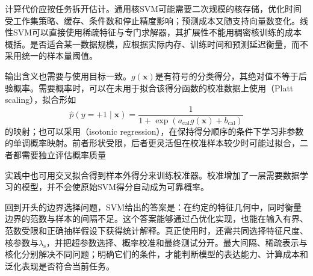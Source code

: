 计算代价应按任务拆开估计。通用核SVM可能需要二次规模的核存储，优化时间受工作集策略、缓存、条件数和停止精度影响；预测成本又随支持向量数变化。线性SVM可以直接使用稀疏特征与专门求解器，其扩展性不能用稠密核训练的成本概括。是否适合某一数据规模，应根据实际内存、训练时间和预测延迟衡量，而不采用统一的样本量阈值。

输出含义也需要与使用目标一致。$g(\bm{x})$是有符号的分类得分，其绝对值不等于后验概率。需要概率时，可以在未用于拟合该得分函数的校准数据上使用（Platt scaling），拟合形如
\[
  \widehat p(y=+1\mid\bm{x})
  =\frac1{1+\exp(a_{\mathrm{cal}}g(\bm{x})+b_{\mathrm{cal}})}
\]
的映射；也可以采用（isotonic regression），在保持得分顺序的条件下学习非参数的单调概率映射。前者形状受限，后者更灵活但在校准样本较少时可能过拟合，二者都需要独立评估概率质量

实践中也可用交叉拟合得到样本外得分来训练校准器。校准增加了一层需要数据学习的模型，并不会使原始SVM得分自动成为可靠概率。

回到开头的边界选择问题，SVM给出的答案是：在约定的特征几何中，同时衡量边界的范数与样本的间隔不足。这个答案能够通过凸优化实现，也能在输入有界、范数受限和正确抽样假设下获得统计解释。真正使用时，还需共同选择特征尺度、核参数与$\lambda_{\mathrm{s}}$，并把超参数选择、概率校准和最终测试分开。最大间隔、稀疏表示与核化分别解决不同问题；明确它们的条件，才能判断模型的表达能力、计算成本和泛化表现是否符合当前任务。
